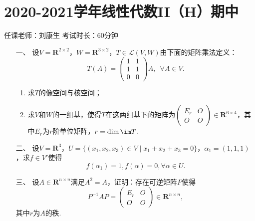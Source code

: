 \section*{2020-2021学年线性代数II（H）期中}

\begin{center}
    任课老师：刘康生\hspace{4em} 考试时长：60分钟
\end{center}

\begin{enumerate}
	\item[一、]设$V=\mathbf{R}^{2\times 2}$，$W=\mathbf{R}^{3\times 2}$，$T\in\mathcal{L}(V,W)$由下面的矩阵乘法定义：
	\[T(A)=\begin{pmatrix}
        1 & 1 \\ 1 & 1 \\ 0 & 0
    \end{pmatrix}A,\enspace \forall A\in V.\]
    \begin{enumerate}[label=(\arabic*)]
        \item 求$T$的像空间与核空间；

        \item 求$V$和$W$的一组基，使得$T$在这两组基下的矩阵为$\begin{pmatrix}
            E_r & O \\ O & O
        \end{pmatrix}\in\mathbf{R}^{6\times 4}$，其中$E_r$为$r$阶单位矩阵，$r=\dim\im T$.
    \end{enumerate}
	\item[二、]设$V=\mathbf{R}^3$，$U=\{(x_1,x_2,x_3)\in V\mid x_1+x_2+x_3=0\}$，$\alpha_1=(1,1,1)$，求$f\in V'$使得
	\[f(\alpha_1)=1,f(\alpha)=0,\forall\alpha\in U.\]
	\item[三、]设$A\in\mathbf{R}^{n\times n}$满足$A^2=A$，证明：存在可逆矩阵$P$使得
	\[P^{-1}AP=\begin{pmatrix}
        E_r & O \\ O & O
    \end{pmatrix}\in\mathbf{R}^{n\times n},\]
    其中$r$为$A$的秩.
\end{enumerate}

\clearpage
